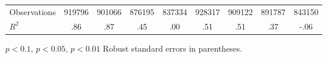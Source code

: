 \begin{table}
\begin{threeparttable}
\begin{tabular}{l*{8}{c}}
\midrule
Observations        &      919796        &      901066        &      876195        &      837334        &      928317        &      909122        &      891787        &      843150        \\
\(R^{2}\)           &         .86        &         .87        &         .45        &         .00        &         .51        &         .51        &         .37        &        -.06        \\
\bottomrule \end{tabular}         \begin{tablenotes}                 \small \item \sym{+} \(p<0.1\), \sym{*} \(p<0.05\), \sym{**} \(p<0.01\) Robust standard errors in parentheses. \\                 \end{tablenotes}  \end{threeparttable} \end{table} 
